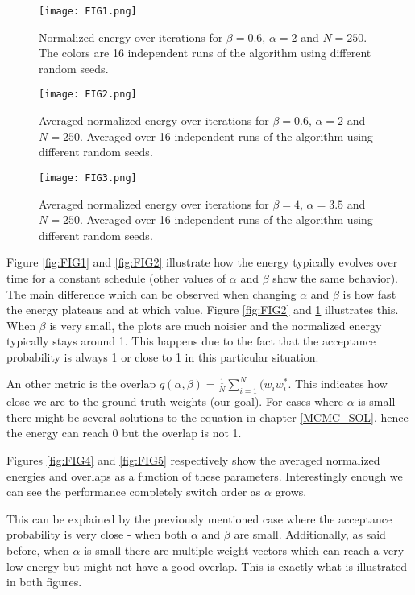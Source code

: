 \documentclass[a4paper]{article}
\begin{document}
\begin{figure}[!htb]
 \centering
{}
\centering
\texttt{[image: FIG1.png]}
\caption{\label{fig:FIG1}Normalized energy over iterations for $\beta = 0.6$, $\alpha = 2$ and $N = 250$. The colors are 16 independent runs of the algorithm using different random seeds.}
\endminipage\par\medskip
{}
\texttt{[image: FIG2.png]}
\caption{\label{fig:FIG2}Averaged normalized energy over iterations for $\beta = 0.6$, $\alpha = 2$ and $N = 250$. Averaged over 16 independent runs of the algorithm using different random seeds.}
\endminipage\hfill
{}%
\texttt{[image: FIG3.png]}
\caption{\label{fig:FIG3}Averaged normalized energy over iterations for $\beta = 4$, $\alpha = 3.5$ and $N = 250$. Averaged over 16 independent runs of the algorithm using different random seeds.}
\endminipage
\end{figure}


Figure \ref{fig:FIG1} and \ref{fig:FIG2} illustrate how the energy typically evolves over time for a constant schedule (other values of $\alpha$ and $\beta$ show the same behavior). The main difference which can be observed when changing $\alpha$ and $\beta$ is how fast the energy plateaus and at which value. Figure \ref{fig:FIG2} and \ref{fig:FIG3} illustrates this. When $\beta$ is very small, the plots are much noisier and the normalized energy typically stays around 1. This happens due to the fact that the acceptance probability is always 1 or close to 1 in this particular situation.

An other metric is the overlap $q(\alpha, \beta) = \frac{1}{N} \sum_{i = 1}^{N}(w_i w_{i}^{*}$. This indicates how close we are to the ground truth weights (our goal). For cases where $\alpha$ is small there might be several solutions to the equation in chapter \ref{MCMC_SOL}, hence the energy can reach 0 but the overlap is not 1.

Figures \ref{fig:FIG4} and \ref{fig:FIG5} respectively show the averaged normalized energies and overlaps as a function of these parameters. Interestingly enough we can see the performance completely switch order as $\alpha$ grows.

This can be explained by the previously mentioned case where the acceptance probability is very close - when both $\alpha$ and $\beta$ are small. Additionally, as said before, when $\alpha$ is small there are multiple weight vectors which can reach a very low energy but might not have a good overlap. This is exactly what is illustrated in both figures.
\end{document}
